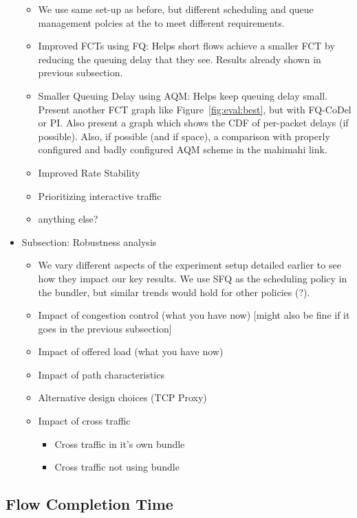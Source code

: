 \begin{itemize}
    \begin{itemize}
        \item We use same set-up as before, but different scheduling and queue management polcies at the \name to meet different requirements. 
        \item Improved FCTs using FQ: Helps short flows achieve a smaller FCT by reducing the queuing delay that they see. Results already shown in previous subsection. 
        \item Smaller Queuing Delay using AQM: Helps keep queuing delay small. Present another FCT graph like Figure~\ref{fig:eval:best}, but with FQ-CoDel or PI. Also present a graph which shows the CDF of per-packet delays (if possible). Also, if possible (and if space), a comparison with properly configured and badly configured AQM scheme in the mahimahi link.
        \item Improved Rate Stability 
        \item Prioritizing interactive traffic
        \item anything else? 
    \end{itemize}
    \item Subsection: Robustness analysis
    \begin{itemize}
        \item We vary different aspects of the experiment setup detailed earlier to see how they impact our key results. We use SFQ as the scheduling policy in the bundler, but similar trends would hold for other policies (?). 
        \item Impact of congestion control (what you have now) [might also be fine if it goes in the previous subsection]
        \item Impact of offered load (what you have now)
        \item Impact of path characteristics
        \item Alternative design choices (TCP Proxy)
        \item Impact of cross traffic
        \begin{itemize}
            \item Cross traffic in it's own bundle
            \item Cross traffic not using bundle
        \end{itemize}
    \end{itemize}
\end{itemize}
\radhika{*/}


\subsection{Flow Completion Time}\label{s:eval:fct}

